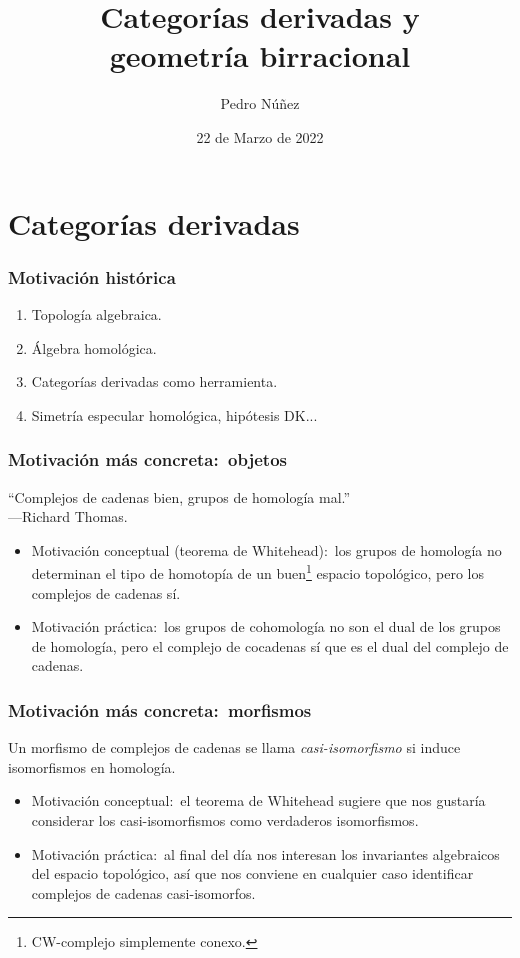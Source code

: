 \documentclass[12pt]{beamer}
\title[Categorías derivadas y geometría birracional]{Categorías derivadas y \\ geometría birracional}
\author{Pedro N\'{u}\~{n}ez}
\institute{Red de Doctorandos en Matemáticas UCM}
\date{22 de Marzo de 2022}
\begin{document}
\frame{\titlepage}

\section{Categorías derivadas}

\begin{frame}
  \frametitle{Motivación histórica}
  \begin{enumerate}
    \item Topología algebraica.
      \vspace{5mm}
      \pause

    \item Álgebra homológica.
      \vspace{5mm}
      \pause

   \item Categorías derivadas como herramienta. 
      \vspace{5mm}
      \pause

    \item Simetría especular homológica, hipótesis DK...
  \end{enumerate}
\end{frame}

\begin{frame}
  \frametitle{Motivación más concreta:~objetos}
  \begin{center}
    ``Complejos de cadenas bien, grupos de homología mal.'' \\
    \hfill ---Richard Thomas.
  \end{center}
  \pause
  \begin{itemize}
    \item Motivación conceptual (teorema de Whitehead):~los grupos de homología no determinan el tipo de homotopía de un buen\footnote{CW-complejo simplemente conexo.} espacio topológico, pero los complejos de cadenas sí.
      \pause
    \item Motivación práctica:~los grupos de cohomología no son el dual de los grupos de homología, pero el complejo de cocadenas sí que es el dual del complejo de cadenas.
  \end{itemize}
\end{frame}

\begin{frame}
  \frametitle{Motivación más concreta:~morfismos}
  Un morfismo de complejos de cadenas se llama \textit{casi-isomorfismo} si induce isomorfismos en homología.
  \pause
  \begin{itemize}
    \item Motivación conceptual:~el teorema de Whitehead sugiere que nos gustaría considerar los casi-isomorfismos como verdaderos isomorfismos.
      \pause
    \item Motivación práctica:~al final del día nos interesan los invariantes algebraicos del espacio topológico, así que nos conviene en cualquier caso identificar complejos de cadenas casi-isomorfos.
  \end{itemize}
\end{frame}
\end{document}
